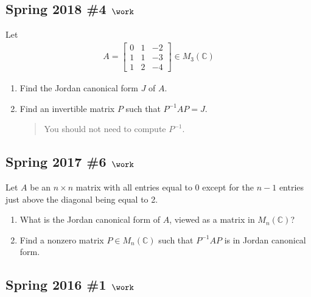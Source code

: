 \hypertarget{spring-2018-4-work}{%
\subsection{\texorpdfstring{Spring 2018 \#4
\(\work\)}{Spring 2018 \#4 \textbackslash work}}\label{spring-2018-4-work}}

Let
\begin{align*}
A=\left[\begin{array}{lll}{0} & {1} & {-2} \\ {1} & {1} & {-3} \\ {1} & {2} & {-4}\end{array}\right] \in M_{3}(\mathbb{C})
\end{align*}

\begin{enumerate}
\def\labelenumi{\alph{enumi}.}
\item
  Find the Jordan canonical form \(J\) of \(A\).
\item
  Find an invertible matrix \(P\) such that \(P^{-1}AP = J\).

  \begin{quote}
  You should not need to compute \(P^{-1}\).
  \end{quote}
\end{enumerate}

\hypertarget{spring-2017-6-work}{%
\subsection{\texorpdfstring{Spring 2017 \#6
\(\work\)}{Spring 2017 \#6 \textbackslash work}}\label{spring-2017-6-work}}

Let \(A\) be an \(n\times n\) matrix with all entries equal to \(0\)
except for the \(n-1\) entries just above the diagonal being equal to 2.

\begin{enumerate}
\def\labelenumi{\alph{enumi}.}
\item
  What is the Jordan canonical form of \(A\), viewed as a matrix in
  \(M_n({\mathbb{C}})\)?
\item
  Find a nonzero matrix \(P\in M_n({\mathbb{C}})\) such that
  \(P^{-1}A P\) is in Jordan canonical form.
\end{enumerate}

\hypertarget{spring-2016-1-work}{%
\subsection{\texorpdfstring{Spring 2016 \#1
\(\work\)}{Spring 2016 \#1 \textbackslash work}}\label{spring-2016-1-work}}

